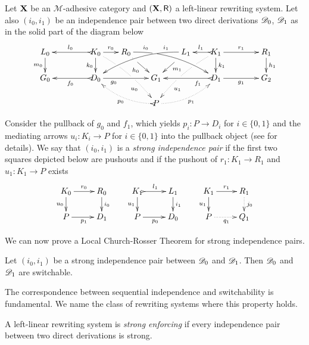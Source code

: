 \begin{definition}
	\label{def:filler}
	Let $\textbf {\textup{X}}$ be an $\mathcal{M}$-adhesive category 
	and $(\textbf {\textup{X}}, \mathsf{R})$ a left-linear rewriting system. 
	Let also $(i_0, i_1)$ be an independence pair between two direct
	derivations $\mathscr{D}_0$, $\mathscr{D}_1$
	as in the solid part of the diagram below
	\[
	\xymatrix@C=18pt@R=17pt{L_0 \ar[d]_{m_0}&& K_0
		\ar[d]_{k_0}\ar@{>->}[ll]_{l_0} \ar[r]^{r_0} \ar@{.>}@/^.20cm/[ddrr]|(.32)\hole|(.57)\hole_(.7){u_0} & R_0
		\ar@/^.35cm/[drrr]|(.3)\hole^(.2){i_0} \ar[dr]|(.3)\hole_{h_0}
		&& L_1 \ar@/_.35cm/[dlll]_(.2){i_1} \ar[dl]|(.3)\hole^{m_1}& K_1
		\ar[d]^{k_1}\ar@{>->}[l]_{l_1} \ar[rr]^{r_1} \ar@{.>}@/_.20cm/[ddll]|(.32)\hole|(.57)\hole^(.7){u_1} && R_1 \ar[d]^{h_1} \\
		G_0 &&
		\ar@{>->}[ll]^{f_0} D_0 \ar[rr]_(.3){g_0}&& G_1 &&
		\ar@{>->}[ll]^(.3){f_1} D_1 \ar[rr]_{g_1}&& G_2\\
		& & & & P \ar@/^.3cm/@{>.>}[ull]^{p_0} \ar@/_.3cm/@{.>}[urr]_{p_1}
	}
	\]
	
	Consider the pullback of $g_0$ and $f_1$, which yields $p_i : P \to D_i$
	for $i \in \{0,1\}$ and the mediating arrows $u_i\colon K_i\to P$ 
	for $i \in \{0,1\}$ 
	into the pullback object (see  for details). 
	We say that $(i_0, i_1)$ is a \emph{strong independence pair} if
	the first two squares depicted  
	below are pushouts and if the pushout of $r_1 : K_1 \to R_1$ and $u_1 : K_1 \to P$ exists
	\[
	\xymatrix@R=16pt{
		K_0 \ar[r]^{r_0} \ar[d]_{u_0}& R_0 \ar[d]^{i_0} & K_1
		\ar@{>->}[r]^{l_1} \ar[d]_{u_1}& L_1 \ar[d]^{i_1}
		&K_1 \ar[r]^{r_1} \ar[d]_{u_1}& R_1\ar@{.>}[d]^{j_0}
		\\
		P \ar[r]_{p_1} & D_1 &P \ar[r]_{p_0} & D_0
		& P \ar@{.>}[r]_{q_1} & Q_1
	}
	\]
\end{definition}

We can now prove a Local Church-Rosser Theorem for strong independence pairs.

\begin{proposition}	\label{pr:church}
	Let $(i_0, i_1)$ be a strong independence pair
	between $\mathscr{D}_0$ and $\mathscr{D}_1$. Then $\mathscr{D}_0$ and
	$\mathscr{D}_1$ are switchable.
\end{proposition}

The correspondence between sequential independence and switchability
is fundamental. We name the class of rewriting systems where this property holds.

\begin{definition}
	A left-linear rewriting system is \emph{strong enforcing} if
	every independence pair between two direct derivations is strong.
\end{definition}

